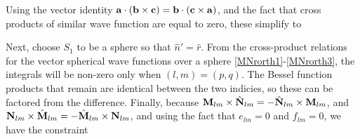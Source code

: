 Using the vector identity $\mathbf{a} \cdot (\mathbf{b} \times \mathbf{c}) = \mathbf{b} \cdot (\mathbf{c} \times \mathbf{a})$, and the fact that cross products of similar wave function are equal to zero, these simplify to  



\vspace{-3mm}
Next, choose $S_1$ to be a sphere so that $\hat{n}' = \hat{r}$. From the cross-product  relations for the vector spherical wave functions over a sphere \eqref{MNrorth1}-\eqref{MNrorth3}, the integrals will be non-zero only when $(l,m) = (p,q)$. The Bessel function products that remain are identical between the two indicies, so these can be factored from the difference. Finally, because $ \mathbf{M}_{lm}\times\hat{\mathbf{N}}_{lm} = -\hat{\mathbf{N}}_{lm}\times \mathbf{M}_{lm}$, and $ \mathbf{N}_{lm}\times\hat{\mathbf{M}}_{lm} = -\hat{\mathbf{M}}_{lm}\times \mathbf{N}_{lm}$, and using the fact that $e_{lm} = 0$ and $f_{lm}=0$, we have the constraint


